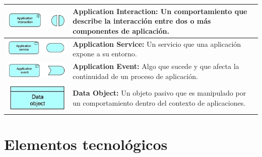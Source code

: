 \begin{longtable}{|c|p{8cm}|}
	\hline
	\includegraphics{anexos/ARCHI/application/interaction.png}   &
	\textbf{Application Interaction:} Un comportamiento que describe la interacción entre dos o más componentes de aplicación.                           \\
	\hline
	\includegraphics{anexos/ARCHI/application/service.png}       &
	\textbf{Application Service:} Un servicio que una aplicación expone a su entorno.                                                                    \\
	\hline
	\includegraphics{anexos/ARCHI/application/event.png}         &
	\textbf{Application Event:} Algo que sucede y que afecta la continuidad de un proceso de aplicación.                                                 \\
	\hline
	\includegraphics{anexos/ARCHI/application/object.png}        &
	\textbf{Data Object:} Un objeto pasivo que es manipulado por un comportamiento dentro del contexto de aplicaciones.                                  \\
	\hline
\end{longtable}

\section{Elementos tecnológicos}

